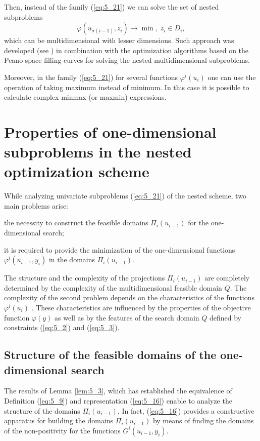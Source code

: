 Then, instead of the family (\ref{eq:5_21}) we can solve the set of nested subproblems 
\begin{displaymath}
\varphi(u_{\sigma(i-1)},z_i)\rightarrow \min,\;z_i\in D_i,
\end{displaymath}
which can be multidimensional with lesser dimensions. Such approach was developed (see \cite{5_BarkGer2014, 5_BarkGerLeb, 5_BarkLeb, 5_SysoyevBarkGerLeb}) in combination with the optimization algorithms based on the Peano space-filling curves for solving the nested multidimensional subproblems.

Moreover, in the family (\ref{eq:5_21}) for several functions $\varphi^i(u_i)$ one can use the operation of taking maximum instead of minimum. In this case it is possible to calculate complex minmax (or maxmin) expressions. 

\section{Properties of one-dimensional subproblems in the nested optimization scheme}
\label{sec:5_2}
While analyzing univariate subproblems (\ref{eq:5_21}) of the nested scheme, two main problems arise:
\begin{description} [a)]
\item [a)] {the necessity to construct the feasible domains $\Pi_i(u_{i-1})$  for the one-dimensional search;}
\item [b)] {it is required to provide the minimization of the one-dimensional functions $\varphi^i(u_{i-1},y_i)$  in the domains  $\Pi_i(u_{i-1})$.}
\end{description}

The structure and the complexity of the projections $\Pi_i(u_{i-1})$  are completely determined by the complexity of the multidimensional feasible domain $Q$. The complexity of the second problem depends on the characteristics of the functions $\varphi^i(u_i)$ . These characteristics are influenced by the properties of the objective function $\varphi(y)$ as well as by the features of the search domain $Q$ defined by constraints (\ref{eq:5_2}) and (\ref{eq:5_3}).

\subsection {Structure of the feasible domains of the one-dimensional search}
\label{subsec:5_2_1}
The results of Lemma \ref{lem:5_3}, which has established the equivalence of Definition (\ref{eq:5_9}) and representation (\ref{eq:5_16}) enable to analyze the structure of the domains $\Pi_i(u_{i-1})$. In fact, (\ref{eq:5_16}) provides a constructive apparatus for building the domains $\Pi_i(u_{i-1})$  by means of finding the domains of the non-positivity for the functions $G^i(u_{i-1},y_i)$.

